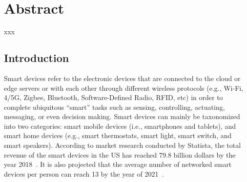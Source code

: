 \documentclass[letterpaper,12pt]{article}
\begin{document}
   \newpage
      \section{Abstract}
   xxx
   
      \newpage

   \tableofcontents
   \restoregeometry
   \newpage


   \cleardoublepage
    \label{listoffig}
   \begin{center}
       \listoffigures
   \end{center}
   \newpage


   \newpage
   \setcounter{page}{1}
   \setcounter{section}{1}
   \begin{singlespace}
       \section{Introduction}
   \end{singlespace}
   \setcounter{section}{1}
   \doublespacing
Smart devices refer to the electronic devices that are connected to the cloud or edge servers or with each other through different wireless protocols (e.g., Wi-Fi, 4/5G, Zigbee, Bluetooth, Software-Defined Radio, RFID, etc) in order to complete ubiquitous ``smart'' tasks such as sensing, controlling, actuating, messaging, or even decision making. Smart devices can mainly be taxonomized into two categories: smart mobile devices (i.e., smartphones and tablets), and smart home devices (e.g., smart thermostats, smart light, smart switch, and smart speakers). According to market research conducted by Statista, the total revenue of the smart devices in the US has reached 79.8 billion dollars by the year 2018~\cite{Statista:smarthome}\cite{statista:smartphone}. It is also projected that the average number of networked smart devices per person can reach 13 by the year of 2021~\cite{smartdeviceperperson}.
\end{document}
